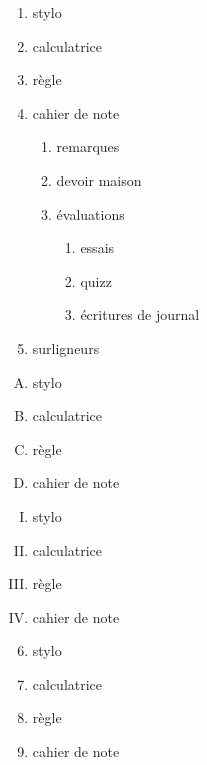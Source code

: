 \documentclass[11pt]{article}
\begin{document}
\begin{enumerate}
\item stylo
\item calculatrice
\item règle
\item cahier de note
	\begin{enumerate}
	\item remarques
	\item devoir maison
	\item évaluations
	
		\begin{enumerate}
		\item essais
		\item quizz
		\item écritures de journal
		\end{enumerate}
	\end{enumerate}
\item surligneurs
\end{enumerate}

\vspace{1cm}

\begin{enumerate}[A.]
\item stylo
\item calculatrice
\item règle
\item cahier de note
\end{enumerate}

\vspace{1cm}

\begin{enumerate}[I.]
\item stylo
\item calculatrice
\item règle
\item cahier de note
\end{enumerate}

\pagebreak

\begin{enumerate}\setcounter{enumi}{5}
\item stylo
\item calculatrice
\item règle
\item cahier de note
\end{enumerate}

\vspace{1cm}
\end{document}
